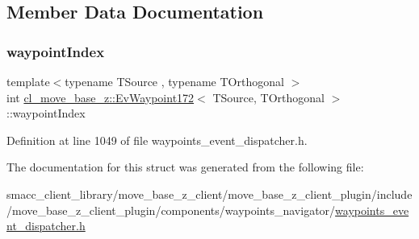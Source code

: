 \subsection{Member Data Documentation}
\mbox{\label{structcl__move__base__z_1_1EvWaypoint172_aca7ef0f5681f2566d86e4398b928a6e5}} 
\subsubsection{\texorpdfstring{waypoint\+Index}{waypointIndex}}
{\footnotesize\ttfamily template$<$typename T\+Source , typename T\+Orthogonal $>$ \\
int \hyperlink{structcl__move__base__z_1_1EvWaypoint172}{cl\+\_\+move\+\_\+base\+\_\+z\+::\+Ev\+Waypoint172}$<$ T\+Source, T\+Orthogonal $>$\+::waypoint\+Index}



Definition at line 1049 of file waypoints\+\_\+event\+\_\+dispatcher.\+h.



The documentation for this struct was generated from the following file\+:\begin{DoxyCompactItemize}
\item 
smacc\+\_\+client\+\_\+library/move\+\_\+base\+\_\+z\+\_\+client/move\+\_\+base\+\_\+z\+\_\+client\+\_\+plugin/include/move\+\_\+base\+\_\+z\+\_\+client\+\_\+plugin/components/waypoints\+\_\+navigator/\hyperlink{waypoints__event__dispatcher_8h}{waypoints\+\_\+event\+\_\+dispatcher.\+h}\end{DoxyCompactItemize}
